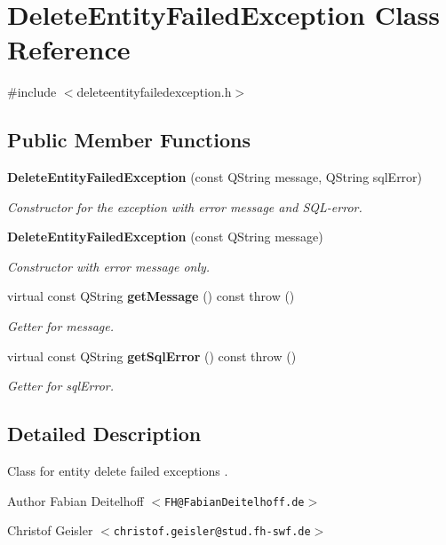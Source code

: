 \section{\-Delete\-Entity\-Failed\-Exception \-Class \-Reference}
\label{db/d17/classDeleteEntityFailedException}


{\ttfamily \#include $<$deleteentityfailedexception.\-h$>$}

\subsection*{\-Public \-Member \-Functions}
\begin{DoxyCompactItemize}
\item 
{\bf \-Delete\-Entity\-Failed\-Exception} (const \-Q\-String message, \-Q\-String sql\-Error)
\begin{DoxyCompactList}\small\item\em \-Constructor for the exception with error message and \-S\-Q\-L-\/error. \end{DoxyCompactList}\item 
{\bf \-Delete\-Entity\-Failed\-Exception} (const \-Q\-String message)
\begin{DoxyCompactList}\small\item\em \-Constructor with error message only. \end{DoxyCompactList}\item 
virtual const \-Q\-String {\bf get\-Message} () const   throw ()
\begin{DoxyCompactList}\small\item\em \-Getter for message. \end{DoxyCompactList}\item 
virtual const \-Q\-String {\bf get\-Sql\-Error} () const   throw ()
\begin{DoxyCompactList}\small\item\em \-Getter for sql\-Error. \end{DoxyCompactList}\end{DoxyCompactItemize}


\subsection{\-Detailed \-Description}
\-Class for entity delete failed exceptions .

\begin{DoxyAuthor}{\-Author}
\-Fabian \-Deitelhoff $<${\tt \-F\-H@\-Fabian\-Deitelhoff.\-de}$>$ 

\-Christof \-Geisler $<${\tt christof.\-geisler@stud.\-fh-\/swf.\-de}$>$ 
\end{DoxyAuthor}


